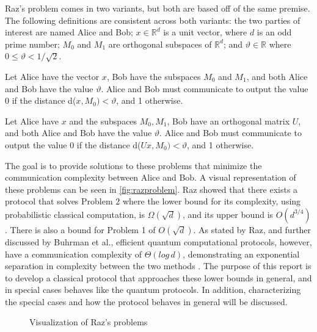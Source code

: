 \documentclass[../3Wworkreport.tex]{subfiles}
\begin{document}
Raz's problem \cite{Raz1999} comes in two variants, but both are based off of the same premise. The following definitions are consistent across both variants: the two parties of interest are named Alice and Bob; $x \in \mathbb{R}^d$ is a unit vector, where $d$ is an odd prime number; $M_0$ and $M_1$ are orthogonal subspaces of $\mathbb{R}^d$; and $\vartheta \in \mathbb{R}$ where $0 \le \vartheta < 1/\sqrt{2}$.
\begin{prob}
Let Alice have the vector $x$, Bob have the subspaces $M_0$ and $M_1$, and both Alice and Bob have the value $\vartheta$. Alice and Bob must communicate to output the value 0 if the distance d($x,M_0) < \vartheta$, and 1 otherwise.
\end{prob}

\begin{prob}
Let Alice have $x$ and the subspaces $M_0, M_1$, Bob have an orthogonal matrix $U$, and both Alice and Bob have the value $\vartheta$. Alice and Bob must communicate to output the value 0 if the distance d($Ux,M_0) < \vartheta$, and 1 otherwise.
\end{prob}

The goal is to provide solutions to these problems that minimize the communication complexity between Alice and Bob. A visual representation of these problems can be seen in \autoref{fig:razproblem}. Raz showed that there exists a protocol that solves Problem 2 where the lower bound for its complexity, using probabilistic classical computation, is $\Omega(\sqrt{d})$, and its upper bound is $O(d^{3/4})$. There is also a bound for Problem 1 of $O(\sqrt{d})$. As stated by Raz, and further discussed by Buhrman et al., efficient quantum computational protocols, however, have a communication complexity of $\Theta(log\,d)$, demonstrating an exponential separation in complexity between the two methods \cite{Buhrman2009}. The purpose of this report is to develop a classical protocol that approaches these lower bounds in general, and in special cases behaves like the quantum protocols. In addition, characterizing the special cases and how the protocol behaves in general will be discussed.

\begin{figure}[!h]
\begin{center}
\end{center}
\caption{Visualization of Raz's problems}
\label{fig:razproblem}
\end{figure}
\end{document}
